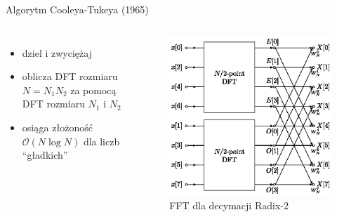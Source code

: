 \documentclass[polish, 12pt, aspectratio=169]{beamer}
\begin{document}
\begin{frame}{Algorytm Cooleya-Tukeya (1965)}
    \begin{columns}
        \begin{itemize}
            \setlength\itemsep{1em}
            \item dziel i zwyciężaj
            \item oblicza DFT rozmiaru \( N = N_1 N_2 \) za pomocą DFT rozmiaru \( N_1 \) i \( N_2 \)
            \item osiąga złożoność \( \mathcal{O}(N \log N) \) dla liczb \enquote{gładkich}
        \end{itemize}
    \pause{}
        \vspace{1em}
        \begin{figure}
            \includegraphics[width=0.9\linewidth]{img/fft-diagram.eps}
            \caption*{FFT dla decymacji Radix-2}
        \end{figure}
    \end{columns}
\end{frame}

\end{document}
